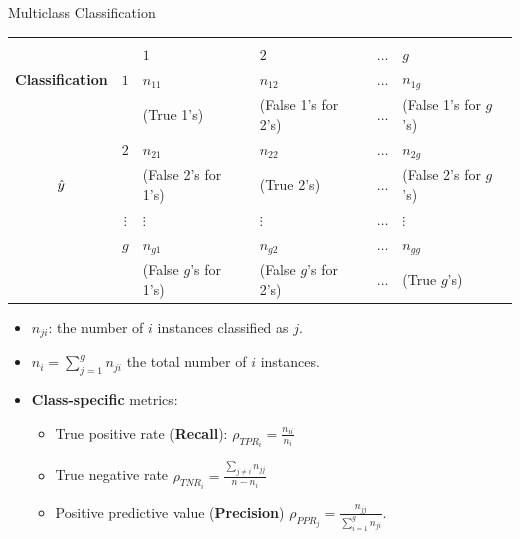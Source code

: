 \documentclass[10pt,compress,t,notes=noshow, xcolor=table]{beamer}
\begin{document}
\begin{frame}{Multiclass Classification}
	\small{
		\begin{center}
			\tiny
			\begin{tabular}{cc|>{\centering\arraybackslash}p{8em}>{\centering\arraybackslash}p{8em}>{\centering\arraybackslash}p{5em}>{\centering\arraybackslash}p{8em}}
				& & \multicolumn{4}{c}{\bfseries True Class $y$} \\
				& & $1$ & $2$ & $\ldots$ & $g$  \\
				\hline
				\bfseries Classification     & $1$ & $n_{11}$  &  $n_{12}$  & $\ldots$ &  $n_{1g}$ \\
				& & (True 1's) & (False 1's for 2's) & $\ldots$ &  (False 1's for $g$'s)  \\
				& $2$ &  $n_{21}$  &  $n_{22}$  & $\ldots$ & $n_{2g}$  \\
				$\hat{y}$ & & (False 2's for 1's) & (True 2's) & $\ldots$ &  (False 2's for $g$'s)  \\
				& $\vdots$ & $\vdots$ & $\vdots$ & $\ldots$ & $\vdots$ \\
				& $g$ & $n_{g1}$ & $n_{g2}$  & $\ldots$ &  $n_{gg}$\\
				& & (False $g$'s for 1's) & (False $g$'s for 2's) & $\ldots$ &  (True $g$'s)  \\
			\end{tabular}
		\end{center}
		
		\begin{itemize}
			\item $n_{ji}$: the number of $i$ instances classified as $j$.

            \item $n_i = \sum_{j=1}^g n_{ji}$ the total number of $i$ instances.

            \item \textbf{Class-specific} metrics:
                \begin{itemize}
                    \small
                    
                    \item True positive rate (\textbf{Recall}): $\rho_{TPR_i} = \frac{n_{ii}}{n_i}$
    
                    \item True negative rate $\rho_{TNR_i} = \frac{\sum_{j\neq i}n_{jj}}{n-n_i}$ 
    
                    \item Positive predictive value (\textbf{Precision}) $\rho_{PPR_j} = \frac{n_{jj}}{\sum_{i=1}^g n_{ji}}$.
                    
                \end{itemize}

		\end{itemize}
	}
\end{frame}
\end{document}
